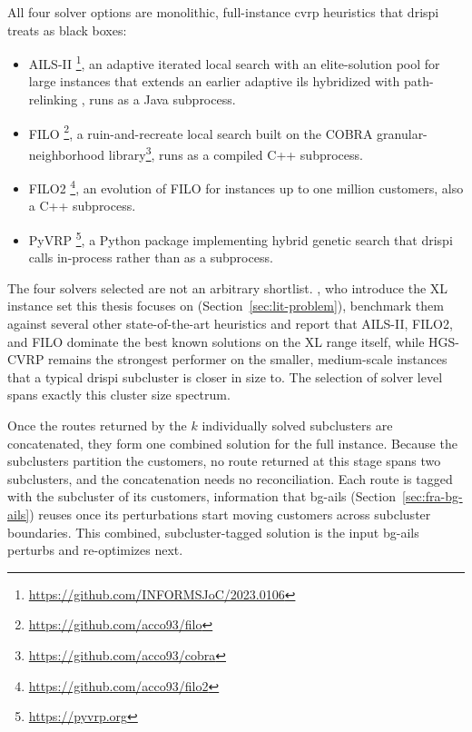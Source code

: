 All four solver options are monolithic, full-instance \gls{cvrp} heuristics that \gls{drispi} treats as black boxes:
\begin{itemize}
  \item AILS-II \citep{maximoAILSIIAdaptiveIterated2024}\footnote{\url{https://github.com/INFORMSJoC/2023.0106}}, an adaptive iterated local search with an elite-solution pool for large instances that extends an earlier adaptive \gls{ils} hybridized with path-relinking \citep{maximoHybridAdaptiveIterated2021}, runs as a Java subprocess.
  \item FILO \citep{accorsiFastScalableHeuristic2021}\footnote{\url{https://github.com/acco93/filo}}, a ruin-and-recreate local search built on the COBRA granular-neighborhood library\footnote{\url{https://github.com/acco93/cobra}}, runs as a compiled C++ subprocess.
  \item FILO2 \citep{accorsiRoutingOneMillion2024}\footnote{\url{https://github.com/acco93/filo2}}, an evolution of FILO for instances up to one million customers, also a C++ subprocess.
  \item PyVRP \citep{woudaPyVRPHighPerformanceVRP2024}\footnote{\url{https://pyvrp.org}}, a Python package implementing hybrid genetic search \citep{vidalHybridGeneticAlgorithm2012, vidalHybridGeneticSearchCVRP2022} that \gls{drispi} calls in-process rather than as a subprocess.
\end{itemize}
The four solvers selected are not an arbitrary shortlist. \citet{queirogaXLInstancesCapacitated2026}, who introduce the XL instance set this thesis focuses on (Section~\ref{sec:lit-problem}), benchmark them against several other state-of-the-art heuristics and report that AILS-II, FILO2, and FILO dominate the best known solutions on the XL range itself, while HGS-CVRP remains the strongest performer on the smaller, medium-scale instances that a typical \gls{drispi} subcluster is closer in size to. The selection of solver level spans exactly this cluster size spectrum.

Once the routes returned by the $k$ individually solved subclusters are concatenated, they form one combined solution for the full instance. Because the subclusters partition the customers, no route returned at this stage spans two subclusters, and the concatenation needs no reconciliation. Each route is tagged with the subcluster of its customers, information that \gls{bg-ails} (Section~\ref{sec:fra-bg-ails}) reuses once its perturbations start moving customers across subcluster boundaries. This combined, subcluster-tagged solution is the input \gls{bg-ails} perturbs and re-optimizes next.


